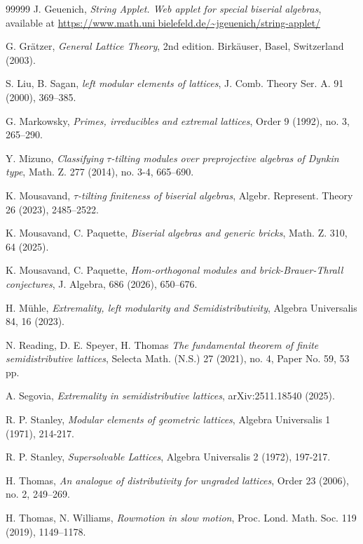 \documentclass{amsart}
\theoremstyle{thmstyle}
\theoremstyle{exstyle}
\theoremstyle{defstyle}
\theoremstyle{remstyle}
\theoremstyle{remstyle}
\begin{document}
\begin{thebibliography}{99999}
     J. Geuenich, 
\emph{String Applet. Web applet for special biserial algebras}, available at \url{https://www.math.uni￾bielefeld.de/~jgeuenich/string-applet/}

     G. Grätzer, 
\emph{General Lattice Theory}, 2nd edition. Birkäuser, Basel, Switzerland (2003).

     S. Liu, B. Sagan,
\emph{left modular elements of lattices}, J. Comb. Theory Ser. A. 91 (2000), 369–385.

    G. Markowsky,
\emph{Primes, irreducibles and extremal lattices}, Order 9 (1992), no. 3, 265–290.

    Y. Mizuno, 
\emph{Classifying $\tau$-tilting modules over preprojective algebras of Dynkin type}, Math. Z. 277 (2014), no. 3-4, 665–690.

     K. Mousavand,
\emph{$\tau$-tilting finiteness of biserial algebras}, Algebr. Represent. Theory 26 (2023), 2485–2522.

    K. Mousavand, C. Paquette,
\emph{Biserial algebras and generic bricks},  Math. Z. 310, 64 (2025).

    K. Mousavand, C. Paquette,
\emph{Hom-orthogonal modules and brick-Brauer-Thrall conjectures}, J. Algebra, 686
(2026), 650–676.

   H. Mühle,
\emph{Extremality, left modularity and Semidistributivity}, Algebra Universalis 84, 16 (2023).

     N. Reading, D. E. Speyer, H. Thomas
\emph{The fundamental theorem of finite semidistributive lattices}, Selecta Math. (N.S.) 27 (2021), no. 4, Paper No. 59, 53 pp.

     A. Segovia, 
\emph{Extremality in semidistributive lattices}, 	arXiv:2511.18540 (2025).

     R. P. Stanley, 
\emph{Modular elements of geometric lattices}, Algebra Universalis 1 (1971), 214-217.

     R. P. Stanley, 
\emph{Supersolvable Lattices}, Algebra Universalis 2 (1972), 197-217.

     H. Thomas, 
\emph{An analogue of distributivity for ungraded lattices}, Order 23 (2006), no. 2, 249–269.

     H. Thomas, N. Williams,
\emph{Rowmotion in slow motion}, Proc. Lond. Math. Soc. 119 (2019), 1149–1178.

\end{thebibliography}
\end{document}
